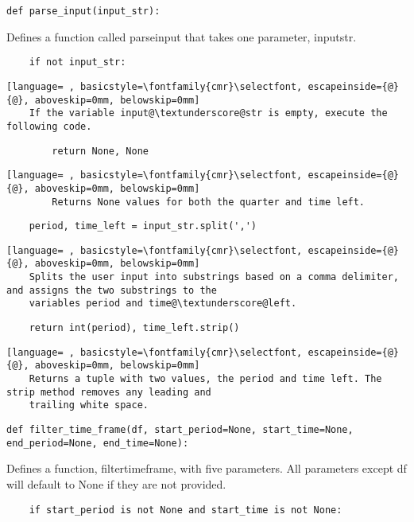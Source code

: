 \documentclass{article}
\begin{document}
\begin{lstlisting}
def parse_input(input_str):
\end{lstlisting}
Defines a function called parse\textunderscore input that takes one parameter, input\textunderscore str.
\begin{lstlisting}
    if not input_str:
\end{lstlisting}
\begin{lstlisting}[language= , basicstyle=\fontfamily{cmr}\selectfont, escapeinside={@}{@}, aboveskip=0mm, belowskip=0mm]
    If the variable input@\textunderscore@str is empty, execute the following code.
\end{lstlisting}
\begin{lstlisting}
        return None, None
\end{lstlisting}
\begin{lstlisting}[language= , basicstyle=\fontfamily{cmr}\selectfont, escapeinside={@}{@}, aboveskip=0mm, belowskip=0mm]
        Returns None values for both the quarter and time left.
\end{lstlisting}
\begin{lstlisting}
    period, time_left = input_str.split(',')
\end{lstlisting}
\begin{lstlisting}[language= , basicstyle=\fontfamily{cmr}\selectfont, escapeinside={@}{@}, aboveskip=0mm, belowskip=0mm]
    Splits the user input into substrings based on a comma delimiter, and assigns the two substrings to the
    variables period and time@\textunderscore@left. 
\end{lstlisting}
\begin{lstlisting}
    return int(period), time_left.strip()
\end{lstlisting}
\begin{lstlisting}[language= , basicstyle=\fontfamily{cmr}\selectfont, escapeinside={@}{@}, aboveskip=0mm, belowskip=0mm]
    Returns a tuple with two values, the period and time left. The strip method removes any leading and
    trailing white space.
\end{lstlisting}
\begin{lstlisting}
def filter_time_frame(df, start_period=None, start_time=None, end_period=None, end_time=None):
\end{lstlisting}
Defines a function, filter\textunderscore time\textunderscore frame, with five parameters. All parameters except df will default to None if they are not provided.
\begin{lstlisting}
    if start_period is not None and start_time is not None:
\end{lstlisting}
\end{document}
